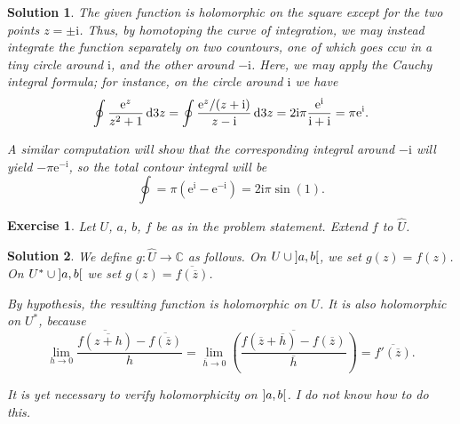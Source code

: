 \documentclass{article}
\newtheorem{ex}{Exercise}
\theoremstyle{nonumberplain}
\newtheorem{sol}{Solution}
\newcommand{\C}{\mathbb{C}}
\newcommand{\I}{\mathrm{i}}
\newcommand{\e}{\mathrm{e}}
\newcommand{\conj}[1]{\overline{#1}}
\begin{document}
\begin{sol}
The given function is holomorphic on the square except for the two points $z = \pm \I$. Thus, by homotoping the curve of integration, we may instead integrate the function separately on two countours, one of which goes ccw in a tiny circle around $\I$, and the other around $-\I$. Here, we may apply the Cauchy integral formula; for instance, on the circle around $\I$ we have
\begin{equation}
\oint \frac{\e^z}{z^2 + 1} \dl3 z = \oint \frac{\e^z/(z+\I)}{z-\I} \dl3 z = 2 \I \pi \frac{\e^\I}{\I + \I} = \pi \e^\I.
\end{equation}

A similar computation will show that the corresponding integral around $-\I$ will yield $-\pi \e^{-\I}$, so the total contour integral will be
\begin{equation}
\oint = \pi(\e^\I - \e^{-\I}) = 2 \I \pi \sin(1).
\end{equation}
\end{sol}


\begin{ex}
Let $U$, $a$, $b$, $f$ be as in the problem statement. Extend $f$ to $\widehat U$.
\end{ex}

\begin{sol}
We define $g \colon \widehat U \to \C$ as follows. On $U \cup \ointerval a b$, we set $g(z) = f(z)$. On $U^* \cup \ointerval a b$ we set $g(z) = \conj{f(\conj z)}$.

By hypothesis, the resulting function is holomorphic on $U$. It is also holomorphic on $U^*$, because
\begin{equation}
\lim_{h \to 0} \frac{\conj{f(\conj{z+h})} - \conj{f(\conj z)}}h = \lim_{\conj h \to 0} \conj{\left(\frac{f(\conj z + \conj h) - f(\conj z)}{\conj h}\right)} = \conj{f'(\conj z)}.
\end{equation}

It is yet necessary to verify holomorphicity on $\ointerval ab$. I do not know how to do this.
\end{sol}
\end{document}

